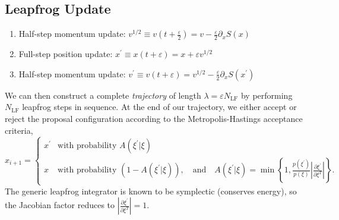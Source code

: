 \documentclass{article} %
\begin{document}
\subsection{\label{subsec:leapfroghmc}Leapfrog Update}
%
\begin{enumerate}
   \item Half-step momentum update: \hspace{12pt}\(%
      v^{1/2} \equiv v{\left(t+\frac{\varepsilon}{2}\right)} = v-\frac{\varepsilon}{2}\partial_{x}S(x)
   \)
   \item Full-step position update: \hspace{36pt}\(%
      x^{\prime} \equiv x(t+\varepsilon) = x + \varepsilon v^{1/2}
   \)
   \item Half-step momentum update:
      \hspace{18pt} \(%
         v^{\prime} \equiv v(t+\varepsilon) = v^{1/2} - \frac{\varepsilon}{2}\partial_{x} S(x^{\prime})
   \)
\end{enumerate}
%
We can then construct a complete \emph{trajectory} of length \(\lambda = \varepsilon N_{\mathrm{LF}}\) by
performing \(N_{\mathrm{LF}}\) leapfrog steps in sequence.
%
At the end of our trajectory, we either accept or reject the proposal configuration according to the Metropolis-Hastings
acceptance criteria,
%
\begin{equation}
   x_{i+1} =
   \begin{cases}%
      x^{\prime} &\mbox{with probability } A(\xi^{\prime}|\xi) \\
      x &\mbox{with probability } (1 - A(\xi^{\prime}|\xi)), \quad\text{and}\quad%
         A(\xi^{\prime}|\xi) = \min\left\{%
            1, \frac{p(\xi^{\prime})}{p(\xi)}\left|\frac{\partial{\xi^{\prime}}}{\partial\xi^{T}}\right|%
         \right\}.
   \end{cases}
   \label{eq:mhcriteria}
\end{equation}
%
The generic leapfrog integrator is known to be symplectic (conserves energy), so the Jacobian factor reduces to
\(\left|\frac{\partial\xi^{\prime}}{\partial\xi^{T}}\right| = 1\). 
%
\end{document}

